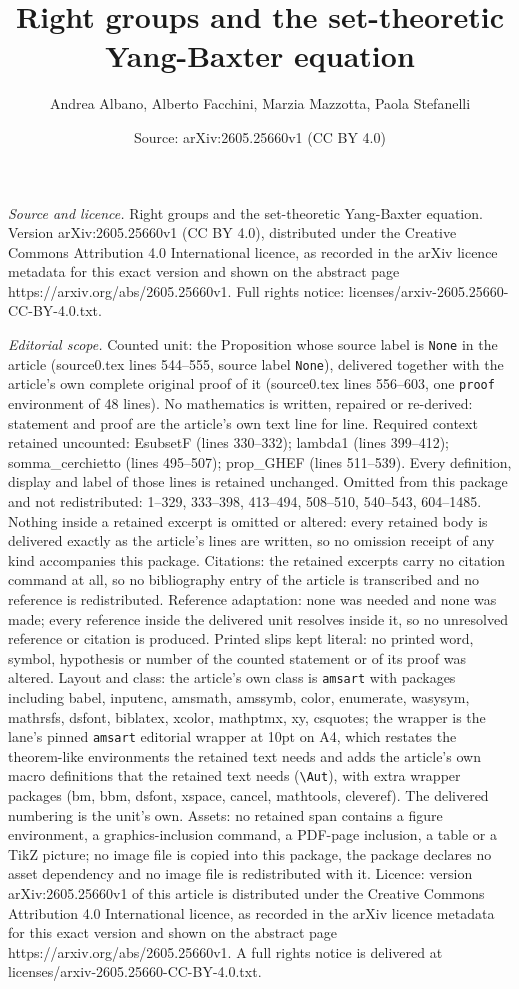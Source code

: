 \documentclass[10pt,a4paper]{amsart}
\title[Right groups and the set-theoretic Yang-Baxter equation]{Right groups and the set-theoretic Yang-Baxter equation}
\author{Andrea Albano, Alberto Facchini, Marzia Mazzotta, Paola Stefanelli}
\date{Source: arXiv:2605.25660v1 (CC BY 4.0)}
\begin{document}
\maketitle

\noindent\emph{Source and licence.} Right groups and the set-theoretic Yang-Baxter equation. Version arXiv:2605.25660v1 (CC BY 4.0), distributed under the Creative Commons Attribution 4.0 International licence, as recorded in the arXiv licence metadata for this exact version and shown on the abstract page https://arxiv.org/abs/2605.25660v1. Full rights notice: licenses/arxiv-2605.25660-CC-BY-4.0.txt.\par\smallskip

\noindent\textit{Editorial scope.} Counted unit: the Proposition whose source label is \texttt{None} in the article (source0.tex lines 544--555, source label \texttt{None}), delivered together with the article's own complete original proof of it (source0.tex lines 556--603, one \texttt{proof} environment of 48 lines). No mathematics is written, repaired or re-derived: statement and proof are the article's own text line for line. Required context retained uncounted: EsubsetF (lines 330--332); lambda1 (lines 399--412); somma\_cerchietto (lines 495--507); prop\_GHEF (lines 511--539). Every definition, display and label of those lines is retained unchanged. Omitted from this package and not redistributed: 1--329, 333--398, 413--494, 508--510, 540--543, 604--1485. Nothing inside a retained excerpt is omitted or altered: every retained body is delivered exactly as the article's lines are written, so no omission receipt of any kind accompanies this package. Citations: the retained excerpts carry no citation command at all, so no bibliography entry of the article is transcribed and no reference is redistributed. Reference adaptation: none was needed and none was made; every reference inside the delivered unit resolves inside it, so no unresolved reference or citation is produced. Printed slips kept literal: no printed word, symbol, hypothesis or number of the counted statement or of its proof was altered. Layout and class: the article's own class is \texttt{amsart} with packages including babel, inputenc, amsmath, amssymb, color, enumerate, wasysym, mathrsfs, dsfont, biblatex, xcolor, mathptmx, xy, csquotes; the wrapper is the lane's pinned \texttt{amsart} editorial wrapper at 10pt on A4, which restates the theorem-like environments the retained text needs and adds the article's own macro definitions that the retained text needs (\texttt{\textbackslash Aut}), with extra wrapper packages (bm, bbm, dsfont, xspace, cancel, mathtools, cleveref). The delivered numbering is the unit's own. Assets: no retained span contains a figure environment, a graphics-inclusion command, a PDF-page inclusion, a table or a TikZ picture; no image file is copied into this package, the package declares no asset dependency and no image file is redistributed with it. Licence: version arXiv:2605.25660v1 of this article is distributed under the Creative Commons Attribution 4.0 International licence, as recorded in the arXiv licence metadata for this exact version and shown on the abstract page https://arxiv.org/abs/2605.25660v1. A full rights notice is delivered at licenses/arxiv-2605.25660-CC-BY-4.0.txt. 
\end{document}
